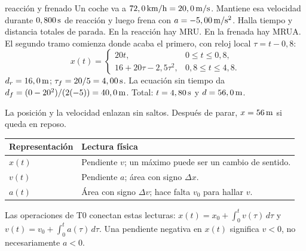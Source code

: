 \documentclass[11pt,a4paper]{article}
\begin{document}
\begin{examplebox}{reacci\'on y frenado}
 Un coche va a $72,0\,\mathrm{km/h}=20,0\,\mathrm{m/s}$.
Mantiene esa velocidad durante $0,800\,\mathrm{s}$ de reacci\'on y luego
frena con $a=-5,00\,\mathrm{m/s^2}$. Halla tiempo y distancia totales de parada.
\solutionblock
{} En la reacci\'on hay MRU. En la frenada hay MRUA.
El segundo tramo comienza donde acaba el primero, con reloj local $\tau=t-0,8$:
\[
x(t)=
\begin{cases}
20t,&0\le t\le0,8,\\
16+20\tau-2,5\tau^2,&0,8\le t\le4,8.
\end{cases}
\]
 $d_r=16,0\,\mathrm{m}$; $\tau_f=20/5=4,00\,\mathrm{s}$.
La ecuaci\'on sin tiempo da $d_f=(0-20^2)/(2(-5))=40,0\,\mathrm{m}$.
Total: $t=4,80\,\mathrm{s}$ y $d=56,0\,\mathrm{m}$.
\begin{center}
\end{center}
 La posici\'on y la velocidad enlazan sin saltos.
Despu\'es de parar, $x=56\,\mathrm{m}$ si queda en reposo.
\end{examplebox}

\begin{tabularx}{\linewidth}{@{}p{2.7cm}Y@{}}
\toprule
Representaci\'on & Lectura f\'isica\\
\midrule
$x(t)$ & Pendiente $v$; un m\'aximo puede ser un cambio de sentido.\\
$v(t)$ & Pendiente $a$; \'area con signo $\Delta x$.\\
$a(t)$ & \'Area con signo $\Delta v$; hace falta $v_0$ para hallar $v$.\\
\bottomrule
\end{tabularx}
Las operaciones de T0 conectan estas lecturas:
$x(t)=x_0+\int_0^t v(\tau)\,d\tau$ y
$v(t)=v_0+\int_0^t a(\tau)\,d\tau$.
Una pendiente negativa en $x(t)$ significa $v<0$, no necesariamente $a<0$.
\end{document}
